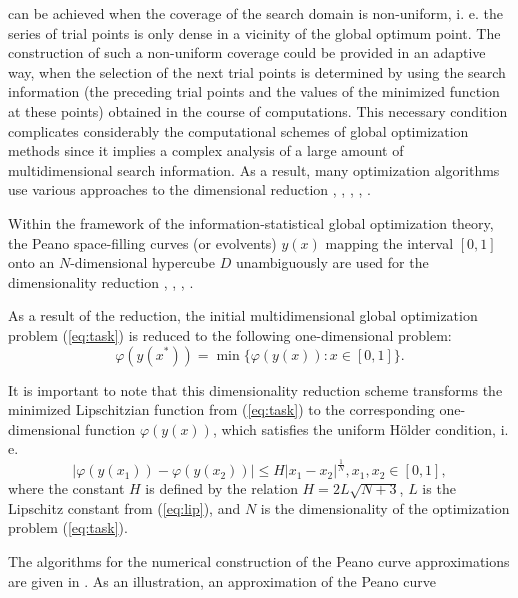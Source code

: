 \documentclass{aims}
\theoremstyle{definition}
\begin{document}
can be achieved when the coverage of the search domain is non-uniform, i. e. the series
of trial points is only dense in a vicinity of the global optimum point. The construction
of such a non-uniform coverage could be provided in an adaptive way, when the selection
of the next trial points is determined by using the search information (the preceding
trial points and the values of the minimized function at these points) obtained in the course
of computations. This necessary condition complicates considerably the computational schemes
of global optimization methods since it implies a complex analysis of a large amount
of multidimensional search information. As a result, many optimization algorithms use
various approaches to the dimensional reduction \cite{pinterGO}, \cite{sergeyevStronginLera2013}, \cite{strongin1978}, \cite{stronginGergelBarkalovParGO}, \cite{strSergGO}.
\par
Within the framework of the information-statistical global optimization theory,
the Peano space-filling curves (or evolvents) \(y(x)\) mapping the interval \([0,1]\)
onto an \(N\)-dimensional hypercube \(D\) unambiguously are used for the dimensionality
reduction \cite{sergeyevStronginLera2013}, \cite{strongin1978}, \cite{stronginGergelBarkalovParGO}, \cite{strSergGO}.
\par
As a result of the reduction, the initial multidimensional global optimization
problem (\ref{eq:task}) is reduced to the following one-dimensional problem:
\begin{equation}
\label{eq:oneDimTask}
\varphi(y(x^*))=\min\{\varphi(y(x)):x\in [0,1]\}.
\end{equation}
\par
It is important to note that this dimensionality reduction scheme transforms the minimized
Lipschitzian function from (\ref{eq:task}) to the corresponding one-dimensional
function \(\varphi(y(x))\), which satisfies the uniform H{\"o}lder condition, i. e.
\begin{equation}
\label{eq:holder}
|\varphi(y(x_1))-\varphi(y(x_2))|\leq H{|x_1-x_2|}^{\frac{1}{N}}, x_1,x_2\in[0,1],
\end{equation}
where the constant $H$ is defined by the relation \(H=2L\sqrt{N+3}\), \(L\) is the Lipschitz
constant from (\ref{eq:lip}), and \(N\) is the dimensionality of the optimization problem (\ref{eq:task}).
\par
The algorithms for the numerical construction of the Peano curve approximations are
given in \cite{strSergGO}. As an illustration, an approximation of the Peano curve
\end{document}
